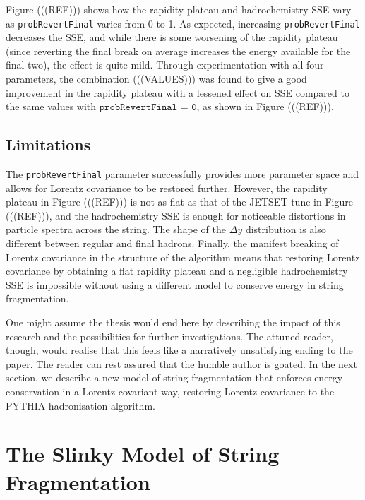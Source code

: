 \documentclass[12pt,a4paper]{report}
\begin{document}
Figure (((REF))) shows how the rapidity plateau and hadrochemistry SSE vary as \texttt{probRevertFinal} varies from 0 to 1. As expected, increasing \texttt{probRevertFinal} decreases the SSE, and while there is some worsening of the rapidity plateau (since reverting the final break on average increases the energy available for the final two), the effect is quite mild. Through experimentation with all four parameters, the combination (((VALUES))) was found to give a good improvement in the rapidity plateau with a lessened effect on SSE compared to the same values with $\texttt{probRevertFinal = 0}$, as shown in Figure (((REF))).

\section{Limitations}
The \texttt{probRevertFinal} parameter successfully provides more parameter space and allows for Lorentz covariance to be restored further. However, the rapidity plateau in Figure (((REF))) is not as flat as that of the JETSET tune in Figure (((REF))), and the hadrochemistry SSE is enough for noticeable distortions in particle spectra across the string. The shape of the $\Delta y$ distribution is also different between regular and final hadrons. Finally, the manifest breaking of Lorentz covariance in the structure of the algorithm means that restoring Lorentz covariance by obtaining a flat rapidity plateau and a negligible hadrochemistry SSE is impossible without using a different model to conserve energy in string fragmentation.

One might assume the thesis would end here by describing the impact of this research and the possibilities for further investigations. The attuned reader, though, would realise that this feels like a narratively unsatisfying ending to the paper. The reader can rest assured that the humble author is goated. In the next section, we describe a new model of string fragmentation that enforces energy conservation in a Lorentz covariant way, restoring Lorentz covariance to the PYTHIA hadronisation algorithm.

\chapter{The Slinky Model of String Fragmentation}
\label{chap:accordion}
\end{document}
